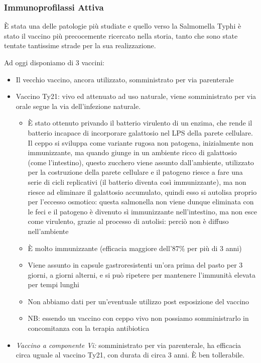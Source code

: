 \subsubsection{Immunoprofilassi Attiva}


È stata una delle patologie più studiate e quello verso la Salmomella
Typhi è stato il vaccino più precocemente ricercato nella storia, tanto
che sono state tentate tantissime strade per la sua realizzazione.

Ad oggi disponiamo di 3 vaccini:

\begin{itemize}
\item
  Il vecchio vaccino, ancora utilizzato, somministrato per via
  parenterale
\item
  Vaccino Ty21: vivo ed attenuato ad uso naturale, viene somministrato
  per via orale segue la via dell'infezione naturale.

  \begin{itemize}
  \item
    È stato ottenuto privando il batterio virulento di un enzima, che
    rende il batterio incapace di incorporare galattosio nel LPS della
    parete cellulare. Il ceppo si sviluppa come variante rugosa non
    patogena, inizialmente non immunizzante, ma quando giunge in un
    ambiente ricco di galattosio (come l'intestino), questo zucchero
    viene assunto dall'ambiente, utilizzato per la costruzione della
    parete cellulare e il patogeno riesce a fare una serie di cicli
    replicativi (il batterio diventa così immunizzante), ma non riesce
    ad eliminare il galattosio accumulato, quindi esso si autolisa
    proprio per l'eccesso osmotico: questa salmonella non viene dunque
    eliminata con le feci e il patogeno è divenuto sì immunizzante
    nell'intestino, ma non esce come virulento, grazie al processo di
    autolisi: perciò non è diffuso nell'ambiente
  \item
    È molto immunizzante (efficacia maggiore dell'87\% per più di 3
    anni)
  \item
    Viene assunto in capsule gastroresistenti un'ora prima del pasto per
    3 giorni, a giorni alterni, e si può ripetere per mantenere
    l'immunità elevata per tempi lunghi
  \item
    Non abbiamo dati per un'eventuale utilizzo post esposizione del
    vaccino
  \item
    NB: essendo un vaccino con ceppo vivo non possiamo somministrarlo in
    concomitanza con la terapia antibiotica
  \end{itemize}
\item
  \emph{Vaccino a componente Vi:} somministrato per via parenterale, ha
  efficacia circa uguale al vaccino Ty21, con durata di circa 3 anni. È
  ben tollerabile.
\end{itemize}

